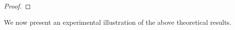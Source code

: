 \begin{proof}
\end{proof}


We now present an experimental illustration of the above theoretical results.



